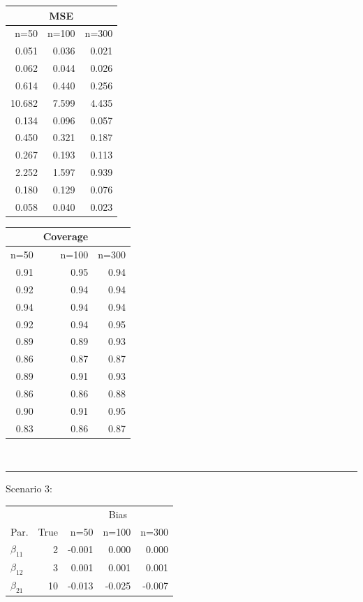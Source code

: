 \documentclass[useAMS,referee]{biom}
\begin{document}
\begin{table}[!h]
\begin{minipage}[b]{.28\textwidth}
\begin{tabular}{rrr}
	& \multicolumn{1}{c}{MSE} & \\ 
	\hline
	n=50 & n=100 & n=300   \\ 	
	\midrule 
	0.051&	0.036&	0.021\\
	0.062&	0.044&	0.026\\
	0.614&	0.440&	0.256\\
	10.682&	7.599&	4.435\\
	0.134&	0.096&	0.057\\
	0.450&	0.321&	0.187\\
	0.267&	0.193&	0.113\\
	2.252&	1.597&	0.939\\
	0.180&	0.129&	0.076\\
	0.058&	0.040&	0.023\\
\end{tabular}
\end{minipage}
\begin{minipage}[b]{.1\textwidth}
\begin{tabular}{rrr} 
	& \multicolumn{1}{c}{Coverage} & \\ 
	\hline
	n=50 & n=100 & n=300   \\ 	
	\midrule 
	0.91&	0.95&	0.94\\
	0.92&	0.94&	0.94\\
	0.94&	0.94&	0.94\\
	0.92&	0.94&	0.95\\
	0.89&	0.89&	0.93\\
	0.86&	0.87&	0.87\\
	0.89&	0.91&	0.93\\
	0.86&	0.86&	0.88\\
	0.90&	0.91&	0.95\\
	0.83&	0.86&	0.87\\ 		
\end{tabular}
\end{minipage}
\\\hrule\vspace{0.2cm}
Scenario 3:\\
\begin{minipage}[b]{.43\textwidth}	
\begin{tabular}{lrrrr} 
	& &   \multicolumn{3}{c}{Bias}  \\ 
	\cmidrule{3-5}
	Par.	&  True & n=50 & n=100 & n=300   \\ 			\midrule 
	$\beta_{11}$ &	2&-0.001&	0.000&	0.000\\
	$\beta_{12}$ &	3&0.001&	0.001&	0.001\\
	$\beta_{21}$&10&-0.013&	-0.025&	-0.007\\

\end{tabular}
\end{minipage}
\end{table}
\end{document}
